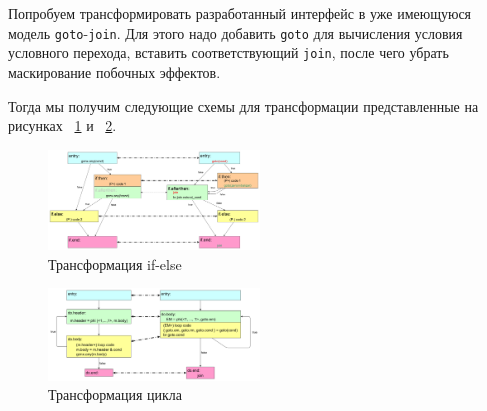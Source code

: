 Попробуем трансформировать разработанный интерфейс в уже имеющуюся модель
\texttt{goto}-\texttt{join}. Для этого надо добавить \texttt{goto} для
вычисления условия условного перехода, вставить соответствующий \texttt{join},
после чего убрать маскирование побочных эффектов.

Тогда мы получим следующие схемы для трансформации представленные на рисунках
~\ref{fig:if-transform} и ~\ref{fig:loop-transform}.
\begin{figure}
  \centering
  \includegraphics[width=0.5\textwidth]{Images/if-else-BE.png}
  \caption{Трансформация if-else}
  \label{fig:if-transform}
\end{figure}
\begin{figure}
  \centering
  \includegraphics[width=0.5\textwidth]{Images/do-while-BE.png}
  \caption{Трансформация цикла}
  \label{fig:loop-transform}
\end{figure}
